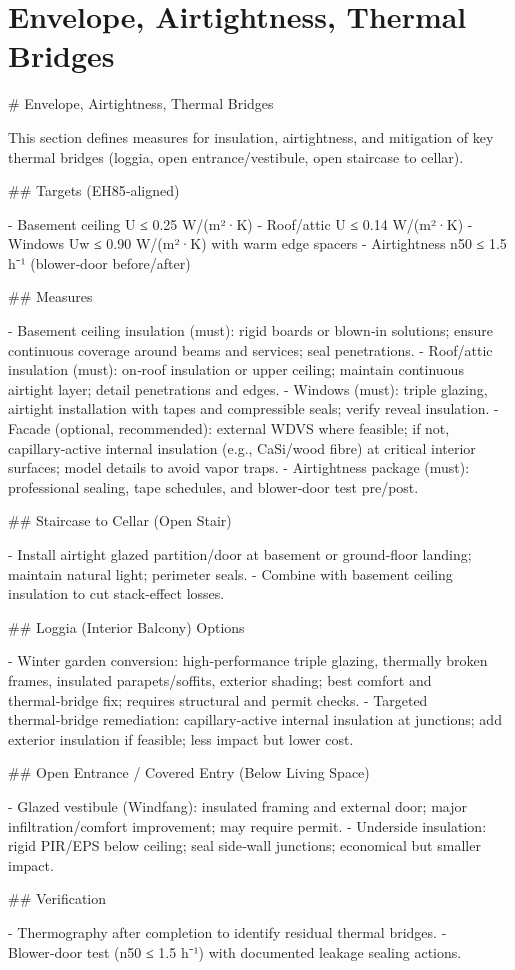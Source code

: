 \documentclass[11pt,oneside]{report}
\begin{document}
\chapter{Envelope, Airtightness, Thermal Bridges}
\begin{markdown}
# Envelope, Airtightness, Thermal Bridges

This section defines measures for insulation, airtightness, and mitigation of key thermal bridges (loggia, open entrance/vestibule, open staircase to cellar).

## Targets (EH85‑aligned)

- Basement ceiling U ≤ 0.25 W/(m²·K)
- Roof/attic U ≤ 0.14 W/(m²·K)
- Windows Uw ≤ 0.90 W/(m²·K) with warm edge spacers
- Airtightness n50 ≤ 1.5 h⁻¹ (blower‑door before/after)

## Measures

- Basement ceiling insulation (must): rigid boards or blown‑in solutions; ensure continuous coverage around beams and services; seal penetrations.
- Roof/attic insulation (must): on‑roof insulation or upper ceiling; maintain continuous airtight layer; detail penetrations and edges.
- Windows (must): triple glazing, airtight installation with tapes and compressible seals; verify reveal insulation.
- Facade (optional, recommended): external WDVS where feasible; if not, capillary‑active internal insulation (e.g., CaSi/wood fibre) at critical interior surfaces; model details to avoid vapor traps.
- Airtightness package (must): professional sealing, tape schedules, and blower‑door test pre/post.

## Staircase to Cellar (Open Stair)

- Install airtight glazed partition/door at basement or ground‑floor landing; maintain natural light; perimeter seals.
- Combine with basement ceiling insulation to cut stack‑effect losses.

## Loggia (Interior Balcony) Options

- Winter garden conversion: high‑performance triple glazing, thermally broken frames, insulated parapets/soffits, exterior shading; best comfort and thermal‑bridge fix; requires structural and permit checks.
- Targeted thermal‑bridge remediation: capillary‑active internal insulation at junctions; add exterior insulation if feasible; less impact but lower cost.

## Open Entrance / Covered Entry (Below Living Space)

- Glazed vestibule (Windfang): insulated framing and external door; major infiltration/comfort improvement; may require permit.
- Underside insulation: rigid PIR/EPS below ceiling; seal side‑wall junctions; economical but smaller impact.

## Verification

- Thermography after completion to identify residual thermal bridges.
- Blower‑door test (n50 ≤ 1.5 h⁻¹) with documented leakage sealing actions.
\end{markdown}
\end{document}
